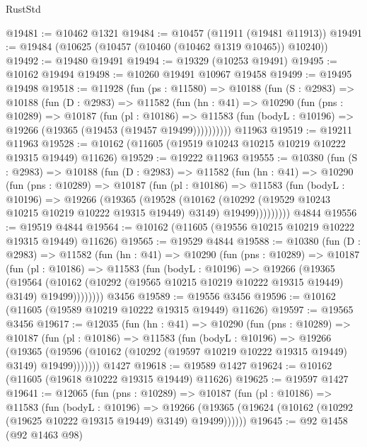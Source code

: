 \begin{lexlean}{RustStd}
\begin{coremodule}
@19481 := @10462 @1321
@19484 := @10457 (@11911 (@19481 @11913))
@19491 := @19484 (@10625 (@10457 (@10460 (@10462 @1319 @10465)) @10240))
@19492 := @19480 @19491
@19494 := @19329 (@10253 @19491)
@19495 := @10162 @19494
@19498 := @10260 @19491 @10967 @19458
@19499 := @19495 @19498
@19518 := @11928
    (fun (ps : @11580) =>
    @10188
      (fun (S : @2983) =>
      @10188
        (fun (D : @2983) =>
        @11582
          (fun (hn : @41) =>
          @10290
            (fun (pns : @10289) =>
            @10187
              (fun (pl : @10186) =>
              @11583 (fun (bodyL : @10196) => @19266 (@19365 (@19453 (@19457 @19499))))))))))
    @11963
@19519 := @19211 @11963
@19528 := @10162 (@11605 (@19519 @10243 @10215 @10219 @10222 @19315 @19449) @11626)
@19529 := @19222 @11963
@19555 := @10380
    (fun (S : @2983) =>
    @10188
      (fun (D : @2983) =>
      @11582
        (fun (hn : @41) =>
        @10290
          (fun (pns : @10289) =>
          @10187
            (fun (pl : @10186) =>
            @11583
              (fun (bodyL : @10196) =>
              @19266
                (@19365
                  (@19528
                    (@10162
                      (@10292 (@19529 @10243 @10215 @10219 @10222 @19315 @19449) @3149)
                      @19499)))))))))
    @4844
@19556 := @19519 @4844
@19564 := @10162 (@11605 (@19556 @10215 @10219 @10222 @19315 @19449) @11626)
@19565 := @19529 @4844
@19588 := @10380
    (fun (D : @2983) =>
    @11582
      (fun (hn : @41) =>
      @10290
        (fun (pns : @10289) =>
        @10187
          (fun (pl : @10186) =>
          @11583
            (fun (bodyL : @10196) =>
            @19266
              (@19365
                (@19564
                  (@10162 (@10292 (@19565 @10215 @10219 @10222 @19315 @19449) @3149) @19499))))))))
    @3456
@19589 := @19556 @3456
@19596 := @10162 (@11605 (@19589 @10219 @10222 @19315 @19449) @11626)
@19597 := @19565 @3456
@19617 := @12035
    (fun (hn : @41) =>
    @10290
      (fun (pns : @10289) =>
      @10187
        (fun (pl : @10186) =>
        @11583
          (fun (bodyL : @10196) =>
          @19266
            (@19365
              (@19596 (@10162 (@10292 (@19597 @10219 @10222 @19315 @19449) @3149) @19499)))))))
    @1427
@19618 := @19589 @1427
@19624 := @10162 (@11605 (@19618 @10222 @19315 @19449) @11626)
@19625 := @19597 @1427
@19641 := @12065
    (fun (pns : @10289) =>
    @10187
      (fun (pl : @10186) =>
      @11583
        (fun (bodyL : @10196) =>
        @19266 (@19365 (@19624 (@10162 (@10292 (@19625 @10222 @19315 @19449) @3149) @19499))))))
@19645 := @92 @1458 (@92 @1463 @98)

\end{coremodule}
\end{lexlean}

